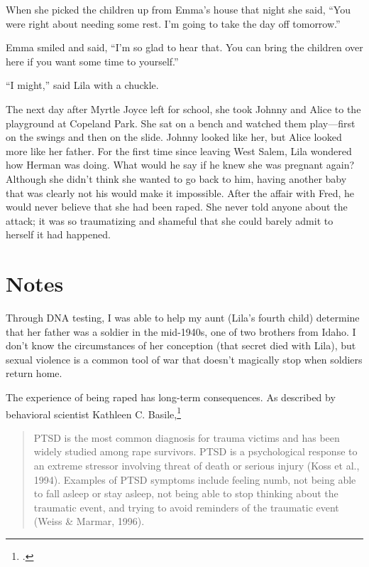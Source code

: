\documentclass[
  american,
  letterpaper,
]{book}
\begin{document}
When she picked the children up from Emma's house that night she said,
``You were right about needing some rest. I'm going to take the day off
tomorrow.''

Emma smiled and said, ``I'm so glad to hear that. You can bring the
children over here if you want some time to yourself.''

``I might,'' said Lila with a chuckle.

The next day after Myrtle Joyce left for school, she took Johnny and
Alice to the playground at Copeland Park. She sat on a bench and watched
them play---first on the swings and then on the slide. Johnny looked
like her, but Alice looked more like her father. For the first time
since leaving West Salem, Lila wondered how Herman was doing. What would
he say if he knew she was pregnant again? Although she didn't think she
wanted to go back to him, having another baby that was clearly not his
would make it impossible. After the affair with Fred, he would never
believe that she had been raped. She never told anyone about the attack;
it was so traumatizing and shameful that she could barely admit to
herself it had happened.

\section{Notes}\label{notes-47}

Through DNA testing, I was able to help my aunt (Lila's fourth child)
determine that her father was a soldier in the mid-1940s, one of two
brothers from Idaho. I don't know the circumstances of her conception
(that secret died with Lila), but sexual violence is a common tool of
war that doesn't magically stop when soldiers return home.

The experience of being raped has long-term consequences. As described
by behavioral scientist Kathleen C. Basile,\footnote{.}

\begin{quote}
PTSD is the most common diagnosis for trauma victims and has been widely
studied among rape survivors. PTSD is a psychological response to an
extreme stressor involving threat of death or serious injury (Koss et
al., 1994). Examples of PTSD symptoms include feeling numb, not being
able to fall asleep or stay asleep, not being able to stop thinking
about the traumatic event, and trying to avoid reminders of the
traumatic event (Weiss \& Marmar, 1996).
\end{quote}
\end{document}
